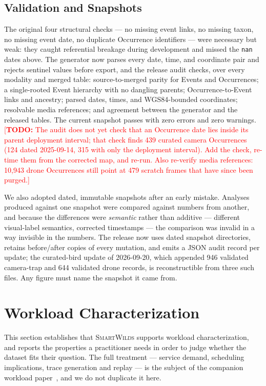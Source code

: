 \documentclass[sigconf]{acmart}
\newcommand{\smartwilds}{\textsc{SmartWilds}\xspace}
\newcommand{\TODO}[1]{\textcolor{red}{\footnotesize[\textbf{TODO:} #1]}}
\newcommand{\TODO}[1]{}
\begin{document}
\subsection{Validation and Snapshots}

The original four structural checks --- no missing event links, no
missing taxon, no missing event date, no duplicate Occurrence
identifiers --- were necessary but weak: they caught referential
breakage during development and missed the \texttt{nan} dates above.
The generator now parses every date, time, and coordinate pair and
rejects sentinel values before export, and the release audit checks,
over every modality and merged table: source-to-merged parity for Events
and Occurrences; a single-rooted Event hierarchy with no dangling
parents; Occurrence-to-Event links and ancestry; parsed dates, times,
and WGS84-bounded coordinates; resolvable media references; and
agreement between the generator and the released tables. The current
snapshot passes with zero errors and zero warnings.
\TODO{The audit does not yet check that an Occurrence date lies inside
its parent deployment interval; that check finds 439 curated camera
Occurrences (124 dated 2025-09-14, 315 with only the deployment
interval). Add the check, re-time them from the corrected map, and
re-run. Also re-verify media references: 10{,}943 drone Occurrences
still point at 479 scratch frames that have since been purged.}

We also adopted dated, immutable snapshots after an early mistake.
Analyses produced against one snapshot were compared against numbers
from another, and because the differences were \emph{semantic} rather
than additive --- different visual-label semantics, corrected timestamps
--- the comparison was invalid in a way invisible in the numbers. The
release now uses dated snapshot directories, retains before/after copies
of every mutation, and emits a JSON audit record per update; the
curated-bird update of 2026-09-20, which appended 946 validated
camera-trap and 644 validated drone records, is reconstructible from
three such files. Any figure must name the snapshot it came from.

\section{Workload Characterization}
\label{sec:characterization}

This section establishes that \smartwilds supports workload
characterization, and reports the properties a practitioner needs in
order to judge whether the dataset fits their question. The full
treatment --- service demand, scheduling implications, trace generation
and replay --- is the subject of the companion workload
paper~\cite{smartwilds_workload}, and we do not duplicate it here.
\end{document}
